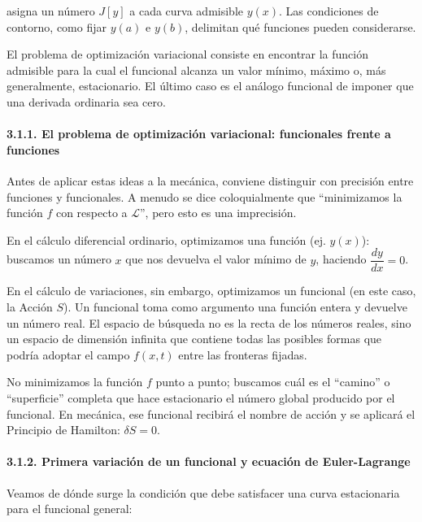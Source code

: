 \documentclass[
  spanish,
]{article}
\begin{document}
asigna un número \(J[y]\) a cada curva admisible \(y(x)\). Las
condiciones de contorno, como fijar \(y(a)\) e \(y(b)\), delimitan qué
funciones pueden considerarse.

El problema de optimización variacional consiste en encontrar la función
admisible para la cual el funcional alcanza un valor mínimo, máximo o,
más generalmente, estacionario. El último caso es el análogo funcional
de imponer que una derivada ordinaria sea cero.

\paragraph{3.1.1. El problema de optimización variacional: funcionales
frente a
funciones}\label{el-problema-de-optimizaciuxf3n-variacional-funcionales-frente-a-funciones}

Antes de aplicar estas ideas a la mecánica, conviene distinguir con
precisión entre funciones y funcionales. A menudo se dice coloquialmente
que ``minimizamos la función \(f\) con respecto a \(\mathcal{L}\)'',
pero esto es una imprecisión.

En el cálculo diferencial ordinario, optimizamos una función (ej.
\(y(x)\)): buscamos un número \(x\) que nos devuelva el valor mínimo de
\(y\), haciendo \(\dfrac{dy}{dx} = 0\).

En el cálculo de variaciones, sin embargo, optimizamos un funcional (en
este caso, la Acción \(S\)). Un funcional toma como argumento una
función entera y devuelve un número real. El espacio de búsqueda no es
la recta de los números reales, sino un espacio de dimensión infinita
que contiene todas las posibles formas que podría adoptar el campo
\(f(x,t)\) entre las fronteras fijadas.

No minimizamos la función \(f\) punto a punto; buscamos cuál es el
``camino'' o ``superficie'' completa que hace estacionario el número
global producido por el funcional. En mecánica, ese funcional recibirá
el nombre de acción y se aplicará el Principio de Hamilton:
\(\delta S = 0\).

\paragraph{3.1.2. Primera variación de un funcional y ecuación de
Euler-Lagrange}\label{primera-variaciuxf3n-de-un-funcional-y-ecuaciuxf3n-de-euler-lagrange}

Veamos de dónde surge la condición que debe satisfacer una curva
estacionaria para el funcional general:
\end{document}
